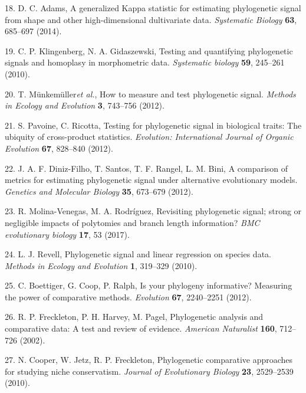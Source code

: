 \documentclass[
]{article}
\begin{document}
\leavevmode\hypertarget{ref-Adams2014a}{}%
18. D. C. Adams, A generalized Kappa statistic for estimating
phylogenetic signal from shape and other high-dimensional dultivariate
data. \emph{Systematic Biology} \textbf{63}, 685--697 (2014).

\leavevmode\hypertarget{ref-Klingenberg2010}{}%
19. C. P. Klingenberg, N. A. Gidaszewski, Testing and quantifying
phylogenetic signals and homoplasy in morphometric data.
\emph{Systematic biology} \textbf{59}, 245--261 (2010).

\leavevmode\hypertarget{ref-Munkemuller_et_al2012}{}%
20. T. Münkemüller\emph{et al.}, How to measure and test phylogenetic
signal. \emph{Methods in Ecology and Evolution} \textbf{3}, 743--756
(2012).

\leavevmode\hypertarget{ref-Pavoine2012}{}%
21. S. Pavoine, C. Ricotta, Testing for phylogenetic signal in
biological traits: The ubiquity of cross-product statistics.
\emph{Evolution: International Journal of Organic Evolution}
\textbf{67}, 828--840 (2012).

\leavevmode\hypertarget{ref-DinizFilho2012}{}%
22. J. A. F. Diniz-Filho, T. Santos, T. F. Rangel, L. M. Bini, A
comparison of metrics for estimating phylogenetic signal under
alternative evolutionary models. \emph{Genetics and Molecular Biology}
\textbf{35}, 673--679 (2012).

\leavevmode\hypertarget{ref-MolinaVenegas2017}{}%
23. R. Molina-Venegas, M. A. Rodríguez, Revisiting phylogenetic signal;
strong or negligible impacts of polytomies and branch length
information? \emph{BMC evolutionary biology} \textbf{17}, 53 (2017).

\leavevmode\hypertarget{ref-Revell2010}{}%
24. L. J. Revell, Phylogenetic signal and linear regression on species
data. \emph{Methods in Ecology and Evolution} \textbf{1}, 319--329
(2010).

\leavevmode\hypertarget{ref-Boettiger_et_al2012}{}%
25. C. Boettiger, G. Coop, P. Ralph, Is your phylogeny informative?
Measuring the power of comparative methods. \emph{Evolution}
\textbf{67}, 2240--2251 (2012).

\leavevmode\hypertarget{ref-Freckleton_et_al2002}{}%
26. R. P. Freckleton, P. H. Harvey, M. Pagel, Phylogenetic analysis and
comparative data: A test and review of evidence. \emph{American
Naturalist} \textbf{160}, 712--726 (2002).

\leavevmode\hypertarget{ref-Cooper2010}{}%
27. N. Cooper, W. Jetz, R. P. Freckleton, Phylogenetic comparative
approaches for studying niche conservatism. \emph{Journal of
Evolutionary Biology} \textbf{23}, 2529--2539 (2010).
\end{document}
